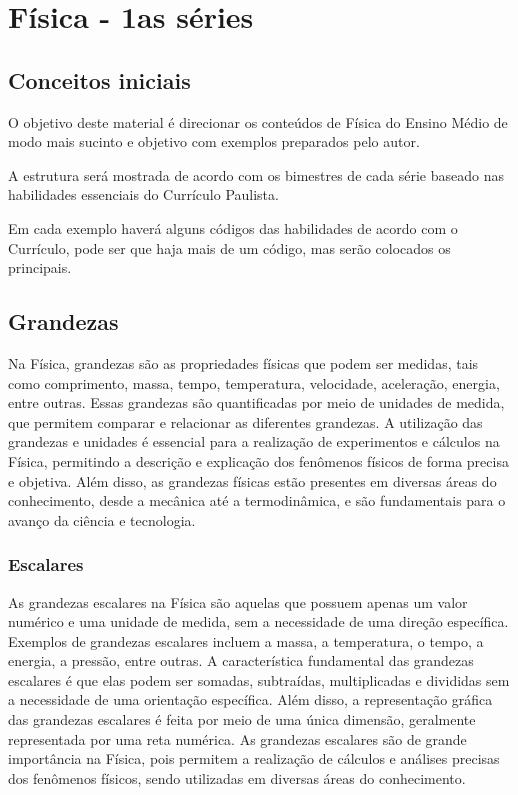 
\chapter{Física - 1as séries}

\section{Conceitos iniciais}
O objetivo deste material é direcionar os conteúdos de Física do Ensino Médio de modo mais sucinto e objetivo com exemplos preparados pelo autor.

A estrutura será mostrada de acordo com os bimestres de cada série baseado nas habilidades essenciais do Currículo Paulista.

Em cada exemplo haverá alguns códigos das habilidades de acordo com o Currículo, pode ser que haja mais de um código, mas serão colocados os principais.

\section{Grandezas}
Na Física, grandezas são as propriedades físicas que podem ser medidas, tais como comprimento, massa, tempo, temperatura, velocidade, aceleração, energia, entre outras. Essas grandezas são quantificadas por meio de unidades de medida, que permitem comparar e relacionar as diferentes grandezas. A utilização das grandezas e unidades é essencial para a realização de experimentos e cálculos na Física, permitindo a descrição e explicação dos fenômenos físicos de forma precisa e objetiva. Além disso, as grandezas físicas estão presentes em diversas áreas do conhecimento, desde a mecânica até a termodinâmica, e são fundamentais para o avanço da ciência e tecnologia.
\subsection{Escalares}
As grandezas escalares na Física são aquelas que possuem apenas um valor numérico e uma unidade de medida, sem a necessidade de uma direção específica. Exemplos de grandezas escalares incluem a massa, a temperatura, o tempo, a energia, a pressão, entre outras. A característica fundamental das grandezas escalares é que elas podem ser somadas, subtraídas, multiplicadas e divididas sem a necessidade de uma orientação específica. Além disso, a representação gráfica das grandezas escalares é feita por meio de uma única dimensão, geralmente representada por uma reta numérica. As grandezas escalares são de grande importância na Física, pois permitem a realização de cálculos e análises precisas dos fenômenos físicos, sendo utilizadas em diversas áreas do conhecimento.
